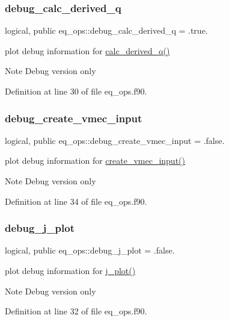 \subsubsection{\texorpdfstring{debug\+\_\+calc\+\_\+derived\+\_\+q}{debug\_calc\_derived\_q}}
{\footnotesize\ttfamily logical, public eq\+\_\+ops\+::debug\+\_\+calc\+\_\+derived\+\_\+q = .true.}



plot debug information for \hyperlink{namespaceeq__ops_a087e08ce6d8ad381b5bac8fc51148d50}{calc\+\_\+derived\+\_\+q()} 

\begin{DoxyNote}{Note}
Debug version only 
\end{DoxyNote}


Definition at line 30 of file eq\+\_\+ops.\+f90.

\mbox{\label{namespaceeq__ops_a07ca60790a262e20bc8632be1530970a}} 
\subsubsection{\texorpdfstring{debug\+\_\+create\+\_\+vmec\+\_\+input}{debug\_create\_vmec\_input}}
{\footnotesize\ttfamily logical, public eq\+\_\+ops\+::debug\+\_\+create\+\_\+vmec\+\_\+input = .false.}



plot debug information for \hyperlink{namespaceeq__ops_a9addef683b3d4a8c587510e4c994ec61}{create\+\_\+vmec\+\_\+input()} 

\begin{DoxyNote}{Note}
Debug version only 
\end{DoxyNote}


Definition at line 34 of file eq\+\_\+ops.\+f90.

\mbox{\label{namespaceeq__ops_a45ba7f46fd439bbd73edfd1fd548b58e}} 
\subsubsection{\texorpdfstring{debug\+\_\+j\+\_\+plot}{debug\_j\_plot}}
{\footnotesize\ttfamily logical, public eq\+\_\+ops\+::debug\+\_\+j\+\_\+plot = .false.}



plot debug information for \hyperlink{namespaceeq__ops_afabdf28e5c26ceb87e6eb8cf3809919d}{j\+\_\+plot()} 

\begin{DoxyNote}{Note}
Debug version only 
\end{DoxyNote}


Definition at line 32 of file eq\+\_\+ops.\+f90.

